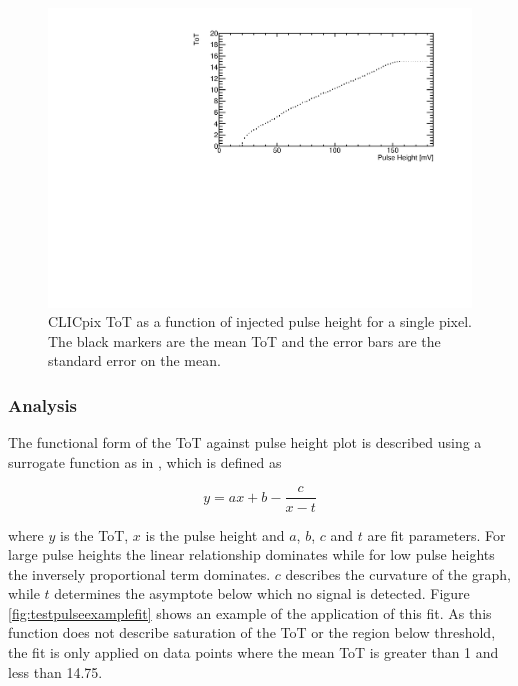 \begin{figure}
\centering
\includegraphics[width=1.0\textwidth]{CLICdpVertex/Plots/TestPulseCalibration/Fits/Set9/ToT_PulseHeight_Set_9_ChipID_001ec0db94b1_Pixel_x0_y0_NoFit.pdf}
\caption[CLICpix ToT as a function of injected pulse height.]{CLICpix ToT as a function of injected pulse height for a single pixel.  The black markers are the mean ToT and the error bars are the standard error on the mean.}
\label{fig:testpulseexamplenofit}
\end{figure}


\subsubsection{Analysis}

The functional form of the ToT against pulse height plot is described using a surrogate function as in \cite{AlipourTehrani:2054922}, which is defined as

\begin{equation}
y  = ax + b  - \frac{c}{x-t}
\end{equation}

\noindent where $y$ is the ToT, $x$ is the pulse height and $a$, $b$, $c$ and $t$ are fit parameters.  For large pulse heights the linear relationship dominates while for low pulse heights the inversely proportional term dominates.  $c$ describes the curvature of the graph, while $t$ determines the asymptote below which no signal is detected.  Figure \ref{fig:testpulseexamplefit} shows an example of the application of this fit.  As this function does not describe saturation of the ToT or the region below threshold, the fit is only applied on data points where the mean ToT is greater than 1 and less than 14.75.  

